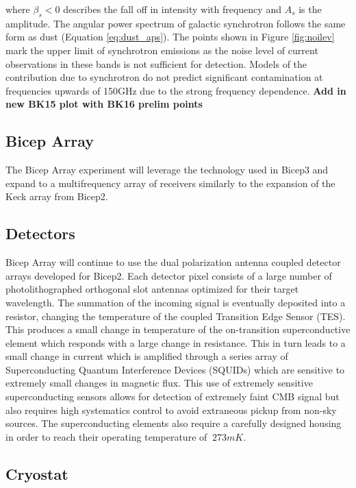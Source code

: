 \documentclass[12pt]{article}
\begin{document}
where $\beta _s < 0$ describes the fall off in intensity with frequency and
$A_s$ is the amplitude. The angular power spectrum of galactic synchrotron
follows the same form as dust (Equation \ref{eq:dust_aps}). The points shown
in Figure \ref{fig:noilev} mark the upper limit of synchrotron emissions as
the noise level of current observations in these bands is not sufficient for
detection. Models of the contribution due to synchrotron do not predict
significant contamination at frequencies upwards of 150GHz due to the strong
frequency dependence.
\textbf{Add in new BK15 plot with BK16 prelim points}


\subsection{Bicep Array}

The Bicep Array experiment will leverage the technology used in Bicep3 and
expand to a multifrequency array of receivers similarly to the expansion of
the Keck array from Bicep2. 

\subsection{Detectors}
Bicep Array will continue to use the dual polarization antenna coupled
detector arrays developed for Bicep2. Each detector pixel consists of a large
number of photolithographed orthogonal slot antennas optimized for their
target wavelength. The summation of the incoming signal is eventually
deposited into a resistor, changing the temperature of the coupled Transition
Edge Sensor (TES). This produces a small change in temperature of the
on-transition superconductive element which responds with a large change in
resistance. This in turn leads to a small change in current which is amplified
through a series array of Superconducting Quantum Interference Devices
(SQUIDs) which are sensitive to extremely small changes in magnetic flux. This
use of extremely sensitive superconducting sensors allows for detection of
extremely faint CMB signal but also requires high systematics control to avoid
extraneous pickup from non-sky sources. The superconducting elements also
require a carefully designed housing in order to reach their operating
temperature of $~273mK$.


\subsection{Cryostat}
\end{document}
